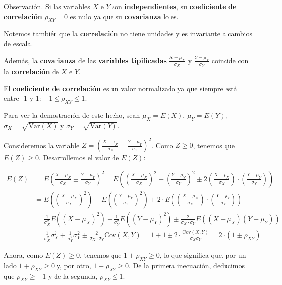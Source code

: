 \documentclass[]{book}
\begin{document}
Observación.
Si las variables \(X\) e \(Y\) son \textbf{independientes}, su \textbf{coeficiente de correlación} \(\rho_{XY}=0\) es nulo ya que su \textbf{covarianza} lo es.

Notemos también que la \textbf{correlación} no tiene unidades y es invariante a cambios de escala.

Además, la \textbf{covarianza} de las \textbf{variables tipificadas} \(\frac{X-\mu_X}{\sigma_X}\) y \(\frac{Y-\mu_Y}{\sigma_Y}\) coincide con la \textbf{correlación} de \(X\) e \(Y\).

El \textbf{coeficiente de correlación} es un valor normalizado ya que siempre está entre -1 y 1: \(-1\leq\rho_{XY}\leq 1\).

Para ver la demostración de este hecho, sean \(\mu_X=E(X)\), \(\mu_Y=E(Y)\), \(\sigma_X=\sqrt{\mathrm{Var}(X)}\) y \(\sigma_Y=\sqrt{\mathrm{Var}(Y)}\).

Consideremos la variable \(Z=\left(\frac{X-\mu_X}{\sigma_X}\pm \frac{Y-\mu_Y}{\sigma_Y}\right)^2\). Como \(Z\geq 0\), tenemos que \(E(Z)\geq 0\). Desarrollemos el valor de \(E(Z)\):

\[
\begin{array}{rl}
E(Z) & = E\left(\frac{X-\mu_X}{\sigma_X}\pm \frac{Y-\mu_Y}{\sigma_Y}\right)^2 = E\left(\left(\frac{X-\mu_X}{\sigma_X}\right)^2+\left(\frac{Y-\mu_Y}{\sigma_Y}\right)^2\pm 2\left(\frac{X-\mu_X}{\sigma_X}\right)\cdot  \left(\frac{Y-\mu_Y}{\sigma_Y}\right)\right) \\ & =
E\left(\left(\frac{X-\mu_X}{\sigma_X}\right)^2\right)+E\left(\left(\frac{Y-\mu_Y}{\sigma_Y}\right)^2\right)\pm 2\cdot  E\left(\left(\frac{X-\mu_X}{\sigma_X}\right) \cdot \left(\frac{Y-\mu_Y}{\sigma_Y}\right)\right) \\ & =
\frac{1}{\sigma_X^2}E\left(\left(X-\mu_X\right)^2\right)+\frac{1}{\sigma_Y^2}E\left(\left(Y-\mu_Y\right)^2\right)\pm \frac{2}{\sigma_X\cdot \sigma_Y}E\left(\left(X-\mu_X\right) \left(Y-\mu_Y\right)\right) \\ & = \frac{1}{\sigma_X^2}\sigma_X^2+
\frac{1}{\sigma_Y^2}\sigma_Y^2 \pm\frac{2}{\sigma_X\cdot \sigma_Y} \mathrm{Cov}(X,Y) = 1+1\pm 2\cdot \frac{\mathrm{Cov}(X,Y)}{\sigma_X\sigma_Y}=2\cdot (1\pm\rho_{XY})
\end{array}
\]

Ahora, como \(E(Z)\geq 0\), tenemos que \(1\pm \rho_{XY}\geq 0\), lo que significa que, por un lado \(1+\rho_{XY}\geq 0\) y, por otro, \(1-\rho_{XY}\geq 0\). De la primera inecuación, deducimos que \(\rho_{XY}\geq -1\) y de la segunda, \(\rho_{XY}\leq 1\).
\end{document}
